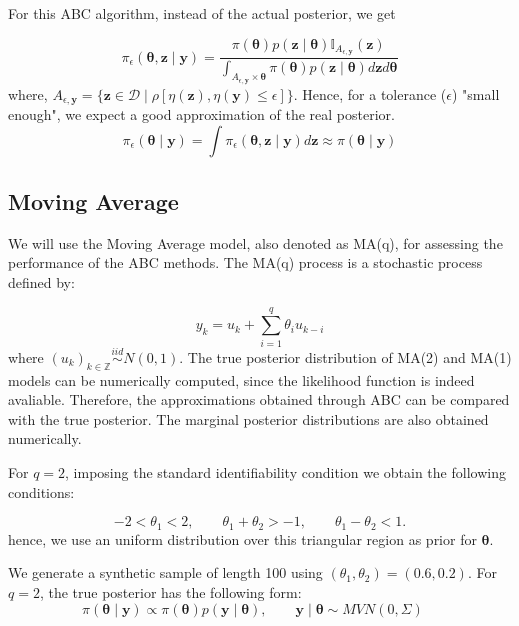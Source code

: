 \documentclass[runningheads]{llncs}
\begin{document}
For this ABC algorithm, instead of the actual posterior,
we get

\begin{equation}
\pi_\epsilon(\bm \theta, \bm z \mid \bm y) = 
\frac{\pi(\bm \theta) p(\bm z \mid \bm \theta)
\mathbb I_{A_{\epsilon,\bm y}}(\bm z)}
{\int_{A_{\epsilon,\bm y}\times \bm\theta}\pi(\bm \theta)
p(\bm z \mid \bm \theta)d\bm z d \bm \theta}
\end{equation}
where, $A_{\epsilon,\bm y} = \{
\bm z \in \mathcal D \mid \rho[\eta(\bm z), \eta(\bm y) \leq \epsilon]
\}$.
Hence, for a tolerance ($\epsilon$) "small enough", we expect a good
approximation of the real posterior.
\begin{equation}
\pi_\epsilon(\bm \theta \mid \bm y) = 
\int \pi_\epsilon(\bm \theta, \bm z \mid \bm y) d \bm z \approx
\pi(\bm \theta \mid \bm y)
\end{equation}


\subsection{Moving Average} \label{subsec:statistical-summaries}

We will use the Moving Average model, also denoted as MA(q),
for assessing the performance of the ABC methods. The MA(q) process
is a stochastic process defined by:

\begin{equation}
y_k = u_k + \sum_{i=1}^q \theta_i u_{k-i}
\end{equation}
where $(u_k)_{k \in \mathbb Z} \overset{iid}{\sim} N(0,1)$.
The true posterior distribution of MA(2) and MA(1) models can be
numerically computed, since the likelihood function is indeed avaliable.
Therefore, the approximations obtained through ABC can be compared with
the true posterior. The marginal posterior distributions are also
obtained numerically.

For $q=2$, imposing the standard identifiability condition
we obtain the following conditions:

\begin{equation}
-2 < \theta_1 < 2, \quad \quad \theta_1+\theta_2 > -1, \quad \quad
\theta_1 - \theta_2 < 1.
\end{equation}
hence, we use an uniform distribution over this triangular region as
prior for $\bm \theta$.

We generate a synthetic sample of length 100 using
$(\theta_1, \theta_2) = (0.6, 0.2)$. For $q=2$, the 
true posterior has the following form:
\begin{equation}
\pi(\bm\theta \mid \bm y) \propto \pi(\bm\theta)
p(\bm y \mid \bm \theta), \quad \quad
\bm y \mid \bm \theta \sim MVN(0, \Sigma) \quad
\end{equation}
\end{document}
